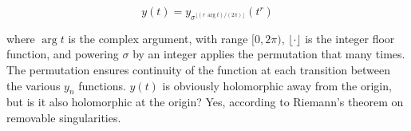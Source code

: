$$y(t) = y_{\sigma^{\lfloor (r \, \arg t)/(2 \pi) \rfloor}}(t^r)$$

where $\arg t$ is the complex argument, with range $[0, 2\pi)$,
$\lfloor \cdot \rfloor$ is the integer floor function, and powering
$\sigma$ by an integer applies the permutation that many times.  The
permutation ensures continuity of the function at each transition
between the various $y_n$ functions.  $y(t)$ is obviously holomorphic
away from the origin, but is it also holomorphic at the origin?  Yes,
according to Riemann's theorem on removable singularities.






